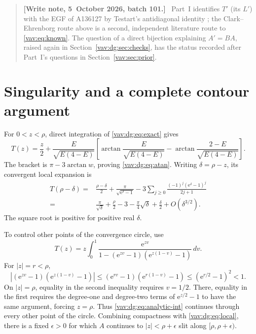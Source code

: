 \documentclass[11pt]{article}
\theoremstyle{remark}\newtheorem{remark}[theorem]{Remark}
\newenvironment{writenoteb}{\begin{quote}\small\raggedright\textbf{[Write note, 5~October 2026, batch 101.]}\ }{\end{quote}}
\newcommand{\ee}{\mathrm e}
\begin{document}
\begin{writenoteb}
Part~I identifies $T'$ (its $L'$) with the EGF of A136127 by Testart's
antidiagonal identity \cite[Section~6]{testart}; the Clark--Ehrenborg route
above is a second, independent literature route to \eqref{vav:eq:known}.
The question of a direct bijection explaining $A'=BA$, raised again in
Section~\ref{vav:dg:sec:checks}, has the status recorded after Part~I's
questions in Section~\ref{vav:sec:prior}.
\end{writenoteb}

\section{Singularity and a complete contour argument}\label{vav:dg:sec:contour}
For $0<z<\rho$, direct integration of \eqref{vav:dg:eq:exact} gives
\[
 T(z)=\frac z2+
 \frac E{\sqrt{E(4-E)}}\left[
  \arctan\frac E{\sqrt{E(4-E)}}
  -\arctan\frac{2-E}{\sqrt{E(4-E)}}\right].
\]
The bracket is $\pi-3\arctan w$, proving \eqref{vav:dg:eq:atan}.
Writing $\delta=\rho-z$, its convergent local expansion is
\begin{equation}\label{vav:dg:eq:local}
\begin{split}
 T(\rho-\delta)
  ={}&\frac{\rho-\delta}{2}
     +\frac{\pi}{\sqrt{\ee^\delta-1}}
     -3\sum_{j\ge0}\frac{(-1)^j(\ee^\delta-1)^j}{2j+1}\\
  ={}&\frac{\pi}{\sqrt\delta}+\frac\rho2-3
       -\frac\pi4\sqrt\delta+\frac\delta2+O(\delta^{3/2}).
\end{split}
\end{equation}
The square root is positive for positive real $\delta$.

To control other points of the convergence circle, use
\begin{equation}\label{vav:dg:eq:analytic-int}
 T(z)=z\int_0^1
 \frac{\ee^{zv}}{1-(\ee^{zv}-1)(\ee^{z(1-v)}-1)}\,dv.
\end{equation}
For $|z|=r<\rho$,
\[
 |(\ee^{zv}-1)(\ee^{z(1-v)}-1)|
 \le(\ee^{rv}-1)(\ee^{r(1-v)}-1)
 \le(\ee^{r/2}-1)^2<1.
\]
On $|z|=\rho$, equality in the second inequality requires $v=1/2$.
There, equality in the first requires the degree-one and degree-two
terms of $\ee^{z/2}-1$ to have the same argument, forcing $z=\rho$.
Thus \eqref{vav:dg:eq:analytic-int} continues through every other point of the
circle. Combining compactness with \eqref{vav:dg:eq:local}, there is a fixed
$\epsilon>0$ for which $A$ continues to
$|z|<\rho+\epsilon$ slit along $[\rho,\rho+\epsilon)$.
\end{document}

